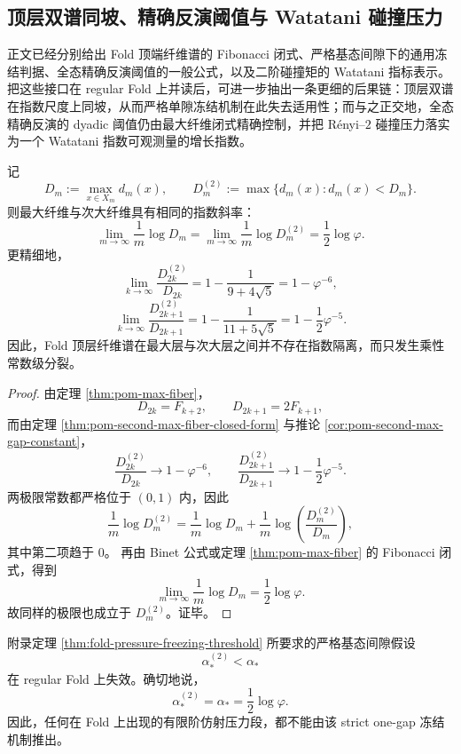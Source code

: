 \subsection{顶层双谱同坡、精确反演阈值与 Watatani 碰撞压力}

正文已经分别给出 Fold 顶端纤维谱的 Fibonacci 闭式、严格基态间隙下的通用冻结判据、全态精确反演阈值的一般公式，以及二阶碰撞矩的 Watatani 指标表示。
把这些接口在 regular Fold 上并读后，可进一步抽出一条更细的后果链：顶层双谱在指数尺度上同坡，从而严格单隙冻结机制在此失去适用性；而与之正交地，全态精确反演的 dyadic 阈值仍由最大纤维闭式精确控制，并把 Rényi--\(2\) 碰撞压力落实为一个 Watatani 指数可观测量的增长指数。

\begin{theorem}[顶层双谱的同坡性]\label{thm:derived-fold-top-two-same-slope}
记
\[
D_m:=\max_{x\in X_m}d_m(x),
\qquad
D_m^{(2)}:=\max\{d_m(x):d_m(x)<D_m\}.
\]
则最大纤维与次大纤维具有相同的指数斜率：
\[
\lim_{m\to\infty}\frac1m\log D_m
=
\lim_{m\to\infty}\frac1m\log D_m^{(2)}
=
\frac12\log\varphi.
\]
更精细地，
\[
\lim_{k\to\infty}\frac{D_{2k}^{(2)}}{D_{2k}}
=
1-\frac{1}{9+4\sqrt5}
=
1-\varphi^{-6},
\]
\[
\lim_{k\to\infty}\frac{D_{2k+1}^{(2)}}{D_{2k+1}}
=
1-\frac{1}{11+5\sqrt5}
=
1-\frac12\varphi^{-5}.
\]
因此，Fold 顶层纤维谱在最大层与次大层之间并不存在指数隔离，而只发生乘性常数级分裂。
\end{theorem}

\begin{proof}
由定理 \ref{thm:pom-max-fiber}，
\[
D_{2k}=F_{k+2},
\qquad
D_{2k+1}=2F_{k+1},
\]
而由定理 \ref{thm:pom-second-max-fiber-closed-form} 与推论
\ref{cor:pom-second-max-gap-constant}，
\[
\frac{D_{2k}^{(2)}}{D_{2k}}\to 1-\varphi^{-6},
\qquad
\frac{D_{2k+1}^{(2)}}{D_{2k+1}}\to 1-\frac12\varphi^{-5}.
\]
两极限常数都严格位于 \((0,1)\) 内，因此
\[
\frac1m\log D_m^{(2)}
=
\frac1m\log D_m+\frac1m\log\!\left(\frac{D_m^{(2)}}{D_m}\right),
\]
其中第二项趋于 \(0\)。
再由 Binet 公式或定理 \ref{thm:pom-max-fiber} 的 Fibonacci 闭式，得到
\[
\lim_{m\to\infty}\frac1m\log D_m=\frac12\log\varphi.
\]
故同样的极限也成立于 \(D_m^{(2)}\)。证毕。
\end{proof}

\begin{corollary}\label{cor:derived-fold-not-in-onegap-freezing-regime}
附录定理 \ref{thm:fold-pressure-freezing-threshold} 所要求的严格基态间隙假设
\[
\alpha_\ast^{(2)}<\alpha_\ast
\]
在 regular Fold 上失效。确切地说，
\[
\alpha_\ast^{(2)}=\alpha_\ast=\frac12\log\varphi.
\]
因此，任何在 Fold 上出现的有限阶仿射压力段，都不能由该 strict one-gap 冻结机制推出。
\end{corollary}

